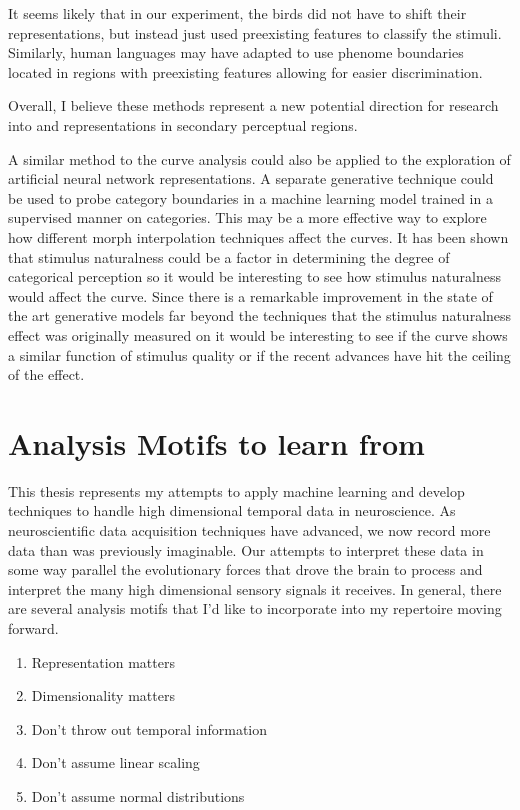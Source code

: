 It seems likely that in our experiment, the birds did not have to shift their representations, but instead just used preexisting features to classify the stimuli. Similarly, human languages may have adapted to use phenome boundaries located in regions with preexisting features allowing for easier discrimination\cite{kuhl1975speech,stevens1981constraints}.

Overall, I believe these methods represent a new potential direction for research into \CP and representations in secondary perceptual regions.

A similar method to the \Thielk curve analysis could also be applied to the exploration of artificial neural network representations. A separate generative technique could be used to probe category boundaries in a machine learning model trained in a supervised manner on categories. This may be a more effective way to explore how different morph interpolation techniques affect the curves. It has been shown that stimulus naturalness could be a factor in determining the degree of categorical perception\cite{van1999categorical} so it would be interesting to see how stimulus naturalness would affect the \Thielk curve. Since there is a remarkable improvement in the state of the art generative models \cite{GAIA, van2016wavenet, waveglow} far beyond the techniques that the stimulus naturalness effect was originally measured on it would be interesting to see if the \Thielk curve shows a similar function of stimulus quality or if the recent advances have hit the ceiling of the effect.

\section{Analysis Motifs to learn from}
This thesis represents my attempts to apply machine learning and develop techniques to handle high dimensional temporal data in neuroscience. As neuroscientific data acquisition techniques have advanced, we now record more data than was previously imaginable. Our attempts to interpret these data in some way parallel the evolutionary forces that drove the brain to process and interpret the many high dimensional sensory signals it receives. In general, there are several analysis motifs that I'd like to incorporate into my repertoire moving forward.

\begin{enumerate}
    \item Representation matters
    \item Dimensionality matters
    \item Don't throw out temporal information
    \item Don't assume linear scaling
    \item Don't assume normal distributions
\end{enumerate}

